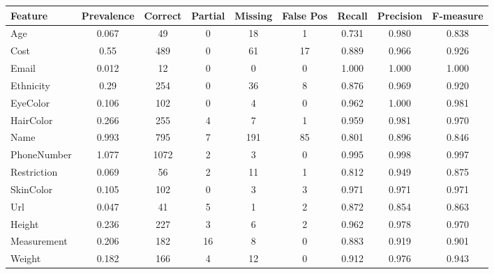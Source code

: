 \documentclass{article}
\begin{document}
\begin{small}
\begin{center}
\begin{tabular}{l c c c c c c c c}
Feature & Prevalence & Correct & Partial & Missing & False Pos & Recall & Precision & F-measure \\ \hline
Age        & 0.067  & 49   &   0   &    18   &   1   &      0.731 &  0.980  &    0.838  \\
Cost       & 0.55   & 489  &   0   &    61   &   17  &      0.889 &  0.966  &    0.926 \\
Email      & 0.012  & 12   &   0   &    0    &   0   &      1.000 &  1.000  &    1.000 \\
Ethnicity  & 0.29   & 254  &   0   &    36   &   8   &      0.876 &  0.969  &    0.920 \\
EyeColor   & 0.106  & 102  &   0   &    4    &   0   &      0.962 &  1.000  &    0.981 \\ 
HairColor  & 0.266  & 255  &   4   &    7    &   1   &      0.959 &  0.981  &    0.970 \\
Name       & 0.993  & 795  &   7   &    191  &   85  &      0.801 &  0.896  &    0.846 \\
PhoneNumber & 1.077 & 1072 &   2   &    3    &   0   &      0.995 &  0.998  &    0.997 \\
Restriction & 0.069 & 56   &   2   &    11   &   1   &      0.812 &  0.949  &    0.875 \\
SkinColor  & 0.105  & 102  &   0   &    3    &   3   &      0.971 &  0.971  &    0.971 \\
Url        & 0.047  & 41   &   5   &    1    &   2   &      0.872 &  0.854  &    0.863 \\
Height     & 0.236  & 227  &   3   &    6    &   2   &      0.962 &  0.978  &    0.970 \\
Measurement & 0.206 & 182  &   16  &    8    &   0   &      0.883 &  0.919  &    0.901 \\
Weight     & 0.182  & 166  &   4   &    12   &   0   &      0.912 &  0.976  &    0.943 \\
\end{tabular}
\end{center}
\end{small}
\end{document}
